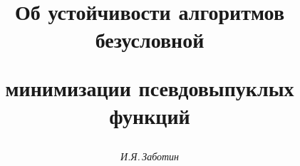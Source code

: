 




% 





\newcommand{\argmax}{\operatornamewithlimits{arg\;max}}


\newcommand{\argmin}{\operatornamewithlimits{arg\;min}}


\newcommand{\tts}[1]{}


\renewcommand{\baselinestretch}{0.98}







\setcounter{page}{33}















\author{\it И.Я.\,Заботин}




\title{Об устойчивости алгоритмов безусловной


минимизации псевдовыпуклых функций}





\date{}




\pagestyle{plain} %







\maketitle


